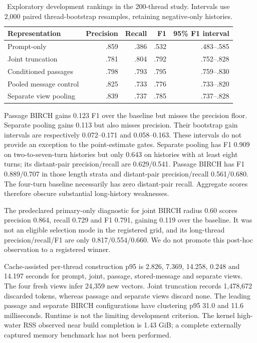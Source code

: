 \documentclass[11pt]{article}
\begin{document}
\begin{table}[ht]
\centering
\begin{tabular}{lrrrr}
\toprule
Representation & Precision & Recall & F1 & 95\% F1 interval \\
\midrule
Prompt-only & .859 & .386 & .532 & .483--.585 \\
Joint truncation & .781 & .804 & .792 & .752--.828 \\
Conditioned passages & .798 & .793 & .795 & .759--.830 \\
Pooled message control & .825 & .733 & .776 & .733--.820 \\
Separate view pooling & .839 & .737 & .785 & .737--.828 \\
\bottomrule
\end{tabular}
\caption{Exploratory development rankings in the 200-thread study. Intervals
use 2,000 paired thread-bootstrap resamples, retaining negative-only histories.}
\label{tab:turn200}
\end{table}

Passage BIRCH gains 0.123 F1 over the baseline but misses the precision floor.
Separate pooling gains 0.113 but also misses precision. Their bootstrap gain
intervals are respectively 0.072--0.171 and 0.058--0.163. These intervals do not
provide an exception to the point-estimate gates. Separate pooling has F1 0.909
on two-to-seven-turn histories but only 0.643 on histories with at least eight
turns; its distant-pair precision/recall are 0.629/0.541. Passage BIRCH has
F1 0.889/0.707 in those length strata and distant-pair precision/recall
0.561/0.680. The four-turn baseline necessarily has zero distant-pair recall.
Aggregate scores therefore obscure substantial long-history weaknesses.

The predeclared primary-only diagnostic for joint BIRCH radius 0.60 scores
precision 0.864, recall 0.729 and F1 0.791, gaining 0.119 over the baseline.
It was not an eligible selection mode in the registered grid, and its
long-thread precision/recall/F1 are only 0.817/0.554/0.660. We do not promote
this post-hoc observation to a registered winner.

Cache-assisted per-thread construction p95 is 2.826, 7.369, 14.258, 0.248 and
14.197 seconds for prompt, joint, passage, stored-message and separate views.
The four fresh views infer 24,359 new vectors. Joint truncation records
1,478,672 discarded tokens, whereas passage and separate views discard none.
The leading passage and separate BIRCH configurations have clustering p95
31.0 and 11.6 milliseconds. Runtime is not the limiting development criterion.
The kernel high-water RSS observed near build completion is 1.43 GiB; a
complete externally captured memory benchmark has not been performed.
\end{document}
